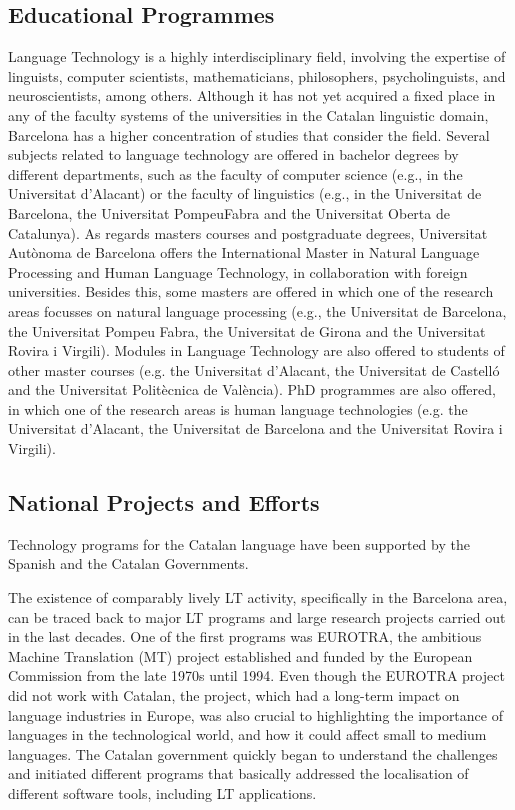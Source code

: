 \begin{multicols}{2}
\subsection{Educational Programmes}

Language Technology is a highly interdisciplinary field, involving the expertise of linguists, computer scientists, mathematicians, philosophers, psycholinguists, and neuroscientists, among others. Although it has not yet acquired a fixed place in any of the faculty systems of the universities in the Catalan linguistic domain, Barcelona has a higher concentration of studies that consider the field. 
Several subjects related to language technology are offered in bachelor degrees by different departments, such as the faculty of computer science (e.g., in the Universitat d’Alacant) or the faculty of linguistics (e.g., in the Universitat de Barcelona, the Universitat PompeuFabra and the Universitat Oberta de Catalunya).
As regards masters courses and postgraduate degrees, Universitat Autònoma de Barcelona offers the International Master in Natural Language Processing and Human Language Technology, in collaboration with foreign universities. Besides this, some masters are offered in which one of the research areas focusses on natural language processing (e.g., the Universitat de Barcelona, the Universitat Pompeu Fabra, the Universitat de Girona and the Universitat Rovira i Virgili). Modules in Language Technology are also offered to students of other master courses (e.g. the Universitat d’Alacant, the Universitat de Castelló and the Universitat Politècnica de València). 
PhD programmes are also offered, in which one of the research areas is human language technologies (e.g. the Universitat d’Alacant, the Universitat de Barcelona and the Universitat Rovira i Virgili).

\subsection{National Projects and Efforts}

Technology programs for the Catalan language have been supported by the Spanish and the Catalan Governments.

The existence of comparably lively LT activity, specifically in the Barcelona area, can be traced back to major LT programs and large research projects carried out in the last decades. One of the first programs was EUROTRA, the ambitious Machine Translation (MT) project established and funded by the European Commission from the late 1970s until 1994. Even though the EUROTRA project did not work with Catalan, the project, which had a long-term impact on language industries in Europe, was also crucial to highlighting the importance of languages in the technological world, and how it could affect small to medium languages. The Catalan government quickly began to understand the challenges and initiated different programs that basically addressed the localisation of different software tools, including LT applications. 


\end{multicols}
